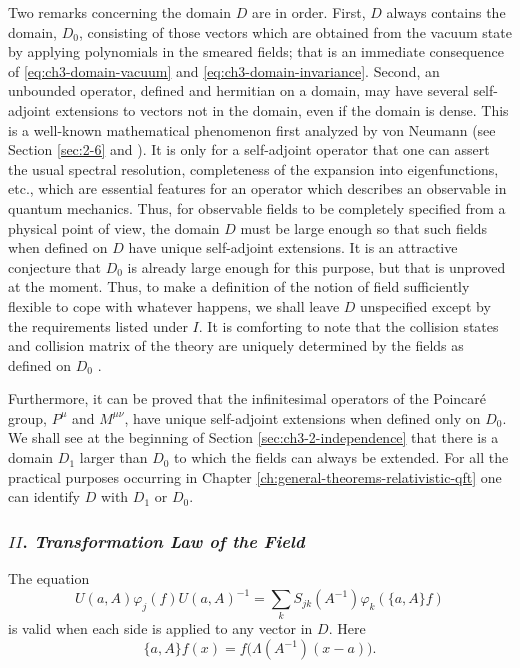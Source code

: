 Two remarks concerning the domain $D$ are in order. First, $D$ always
contains the domain, $D_0$, consisting of those vectors which are obtained
from the vacuum state by applying polynomials in the smeared fields; that is
an immediate consequence of \eqref{eq:ch3-domain-vacuum} and \eqref{eq:ch3-domain-invariance}. Second, an unbounded operator,
defined and hermitian on a domain, may have several self-adjoint extensions
to vectors not in the domain, even if the domain is dense. This is a
well-known mathematical phenomenon first analyzed by von Neumann (see
Section \ref{sec:2-6} and \cite{pct-20}). It is only for a
self-adjoint operator that one can assert the usual spectral resolution,
completeness of the expansion into eigenfunctions, etc., which are essential
features for an operator which describes an observable in quantum mechanics.
Thus, for observable fields to be completely specified from a physical point
of view, the domain $D$ must be large enough so that such fields when defined
on $D$ have unique self-adjoint extensions. It is an attractive conjecture
that $D_0$ is already large enough for this purpose, but that is unproved at
the moment. Thus, to make a definition of the notion of field sufficiently
flexible to cope with whatever happens, we shall leave $D$ unspecified except
by the requirements listed under $I$. It is comforting to note that the
collision states and collision matrix of the theory are uniquely determined
by the fields as defined on $D_0$ \cite{pct-ch3-5,pct-ch3-15}.

Furthermore, it can be proved that the infinitesimal operators of the
Poincar\'e group, $P^\mu$ and $M^{\mu\nu}$, have unique self-adjoint
extensions when defined only on $D_0$. We shall see at the beginning of
Section \ref{sec:ch3-2-independence} that there is a domain $D_1$ larger than $D_0$ to which the fields
can always be extended. For all the practical purposes occurring in
Chapter \ref{ch:general-theorems-relativistic-qft} one can identify $D$ with $D_1$ or $D_0$.

\subsubsection*{$II$. \emph{Transformation Law of the Field}}

The equation
\begin{equation}
  U(a,A)\varphi_j(f)U(a,A)^{-1}
  =\sum_k S_{jk}(A^{-1})\varphi_k(\{a,A\}f)
  \tag{3-4}\label{eq:ch3-field-transform}
\end{equation}
is valid when each side is applied to any vector in $D$. Here
\begin{equation}
  \{a,A\}f(x)=f\bigl(\Lambda(A^{-1})(x-a)\bigr).
  \tag{3-5}\label{eq:ch3-test-transform}
\end{equation}

